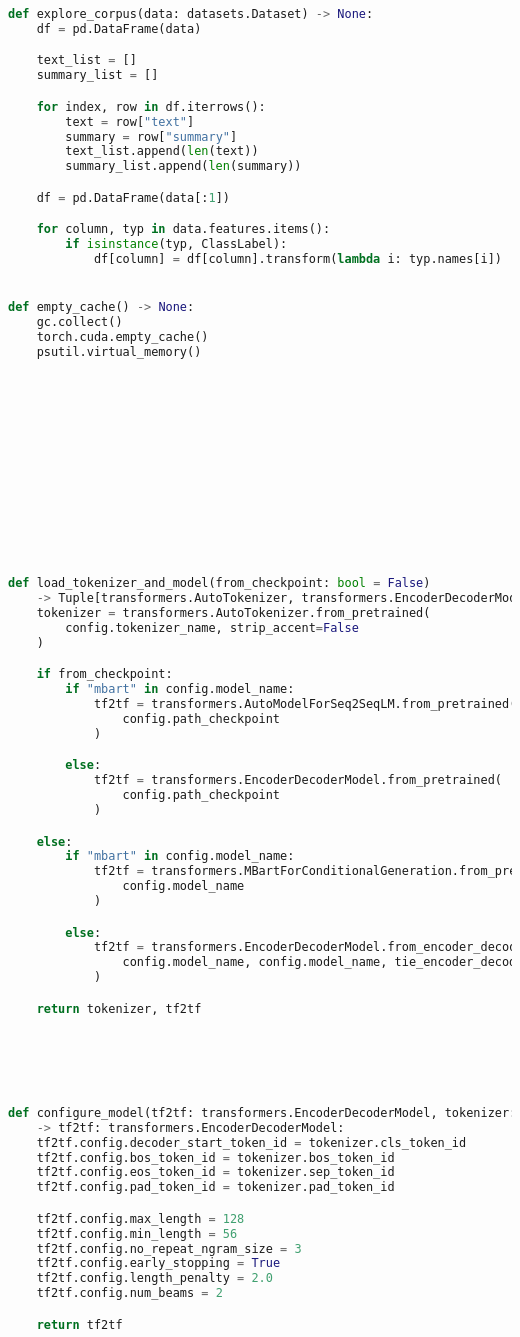 \begin{lstlisting}[language=Python, caption=Hilfsmethoden]
def explore_corpus(data: datasets.Dataset) -> None:
    df = pd.DataFrame(data)

    text_list = []
    summary_list = []

    for index, row in df.iterrows():
        text = row["text"]
        summary = row["summary"]
        text_list.append(len(text))
        summary_list.append(len(summary))

    df = pd.DataFrame(data[:1])

    for column, typ in data.features.items():
        if isinstance(typ, ClassLabel):
            df[column] = df[column].transform(lambda i: typ.names[i])


def empty_cache() -> None:
    gc.collect()
    torch.cuda.empty_cache()
    psutil.virtual_memory()













def load_tokenizer_and_model(from_checkpoint: bool = False)
	-> Tuple[transformers.AutoTokenizer, transformers.EncoderDecoderModel]:
    tokenizer = transformers.AutoTokenizer.from_pretrained(
        config.tokenizer_name, strip_accent=False
    )

    if from_checkpoint:
        if "mbart" in config.model_name:
            tf2tf = transformers.AutoModelForSeq2SeqLM.from_pretrained(
                config.path_checkpoint
            )

        else:
            tf2tf = transformers.EncoderDecoderModel.from_pretrained(
                config.path_checkpoint
            )

    else:
        if "mbart" in config.model_name:
            tf2tf = transformers.MBartForConditionalGeneration.from_pretrained(
                config.model_name
            )

        else:
            tf2tf = transformers.EncoderDecoderModel.from_encoder_decoder_pretrained(
                config.model_name, config.model_name, tie_encoder_decoder=True
            )

    return tokenizer, tf2tf
    
    
    
    
    
    
def configure_model(tf2tf: transformers.EncoderDecoderModel, tokenizer: transformers.AutoTokenizer)
	-> tf2tf: transformers.EncoderDecoderModel:
    tf2tf.config.decoder_start_token_id = tokenizer.cls_token_id
    tf2tf.config.bos_token_id = tokenizer.bos_token_id
    tf2tf.config.eos_token_id = tokenizer.sep_token_id
    tf2tf.config.pad_token_id = tokenizer.pad_token_id

    tf2tf.config.max_length = 128
    tf2tf.config.min_length = 56
    tf2tf.config.no_repeat_ngram_size = 3
    tf2tf.config.early_stopping = True
    tf2tf.config.length_penalty = 2.0
    tf2tf.config.num_beams = 2

    return tf2tf
\end{lstlisting}
\newpage


